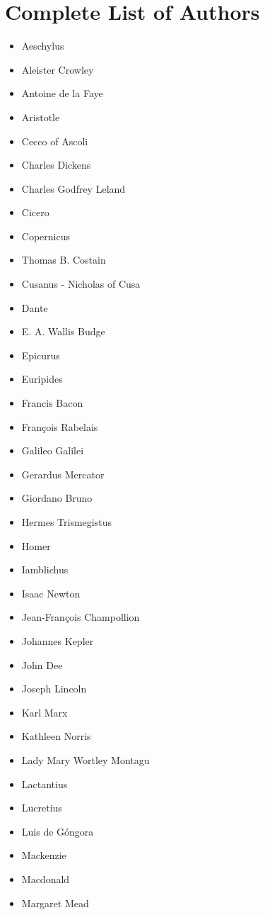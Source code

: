 \documentclass[12pt]{article}
\providecommand{\tightlist}{%
  \setlength{\itemsep}{0pt}\setlength{\parskip}{0pt}}
\begin{document}
\section{Complete List of Authors}\label{complete-list-of-authors}
\begin{itemize}
\tightlist
\item
  Aeschylus
\item
  Aleister Crowley
\item
  Antoine de la Faye
\item
  Aristotle
\item
  Cecco of Ascoli
\item
  Charles Dickens
\item
  Charles Godfrey Leland
\item
  Cicero
\item
  Copernicus
\item
  Thomas B. Costain
\item
  Cusanus - Nicholas of Cusa
\item
  Dante
\item
  E. A. Wallis Budge
\item
  Epicurus
\item
  Euripides
\item
  Francis Bacon
\item
  François Rabelais
\item
  Galileo Galilei
\item
  Gerardus Mercator
\item
  Giordano Bruno
\item
  Hermes Trismegistus
\item
  Homer
\item
  Iamblichus
\item
  Isaac Newton
\item
  Jean-François Champollion
\item
  Johannes Kepler
\item
  John Dee
\item
  Joseph Lincoln
\item
  Karl Marx
\item
  Kathleen Norris
\item
  Lady Mary Wortley Montagu
\item
  Lactantius
\item
  Lucretius
\item
  Luis de Góngora
\item
  Mackenzie
\item
  Macdonald
\item
  Margaret Mead

\end{itemize}
\end{document}
